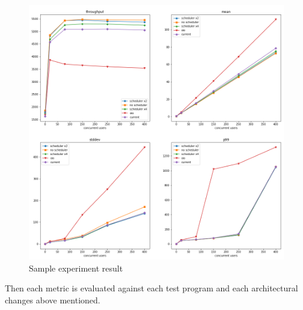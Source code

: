  \begin{figure}[htbp]
 	\begin{center}
 		\includegraphics[scale=0.35]{figures/prime_small test results.png}
 	\end{center}
 	\caption{Sample experiment result}
 	\label{sample_result}
 \end{figure}

Then each metric is evaluated against each test program and each architectural changes above mentioned.

